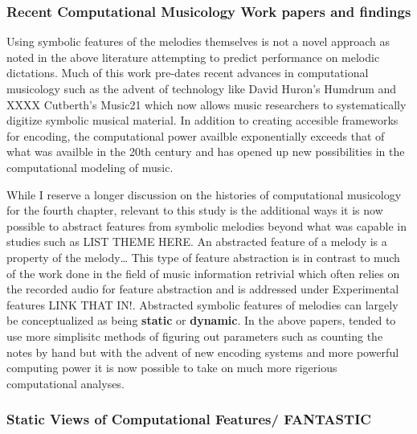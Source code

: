\documentclass[]{book}
\theoremstyle{definition}
\theoremstyle{definition}
\theoremstyle{definition}
\theoremstyle{remark}
\begin{document}
\hypertarget{recent-computational-musicology-work-papers-and-findings}{%
\subsubsection{Recent Computational Musicology Work papers and
findings}\label{recent-computational-musicology-work-papers-and-findings}}

Using symbolic features of the melodies themselves is not a novel
approach as noted in the above literature attempting to predict
performance on melodic dictations. Much of this work pre-dates recent
advances in computational musicology such as the advent of technology
like David Huron's Humdrum \citep{huronHumdrumToolkitReference1994} and
XXXX Cutberth's Music21 \citep{cuthbertMusic21ToolkitComputerAided2010}
which now allows music researchers to systematically digitize symbolic
musical material. In addition to creating accesible frameworks for
encoding, the computational power availble exponentially exceeds that of
what was availble in the 20th century and has opened up new
possibilities in the computational modeling of music.

While I reserve a longer discussion on the histories of computational
musicology for the fourth chapter, relevant to this study is the
additional ways it is now possible to abstract features from symbolic
melodies beyond what was capable in studies such as LIST THEME HERE. An
abstracted feature of a melody is a property of the melody\ldots{} This
type of feature abstraction is in contrast to much of the work done in
the field of music information retrivial which often relies on the
recorded audio for feature abstraction and is addressed under
Experimental features LINK THAT IN!. Abstracted symbolic features of
melodies can largely be conceptualized as being \textbf{static} or
\textbf{dynamic}. In the above papers, tended to use more simplisitc
methods of figuring out parameters such as counting the notes by hand
but with the advent of new encoding systems and more powerful computing
power it is now possible to take on much more rigerious computational
analyses.

\hypertarget{static-views-of-computational-features-fantastic}{%
\subsubsection{Static Views of Computational Features/
FANTASTIC}\label{static-views-of-computational-features-fantastic}}
\end{document}
